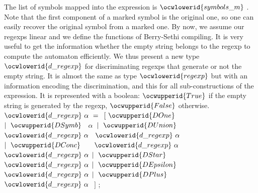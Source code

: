 \documentclass[12pt]{article}
\begin{document}
\ocwendcode{}\ocwindent{0.00em}
The list of symbols mapped into the expression is \ocwbegindcode{}$\ocwlowerid{symbols\_m}$\ocwenddcode{} .
   Note that the first component of a marked symbol is the original one, so
   one can easily recover the original symbol from a marked one. 
\ocweol
\ocwindent{0.00em}
By now, we assume our regexps linear and we define the functions of 
   Berry-Sethi compiling. 
\ocweol
\ocwindent{0.00em}
It is very useful to get the information whether the empty string belongs
   to the regexp to compute the automaton efficiently.
   We thus present a new type \ocwbegindcode{}$\ocwlowerid{d\_regexp}$\ocwenddcode{} for discriminating regexps that
   generate or not the empty string. 
   It is almost the same as type \ocwbegindcode{}$\ocwlowerid{regexp}$\ocwenddcode{} but with an information encoding
   the discrimination, and this for all sub-constructions of the expression.
   It is represented with a boolean: 
   \ocwbegindcode{}$\ocwupperid{True}$\ocwenddcode{} if the empty string is generated by the regexp, 
   \ocwbegindcode{}$\ocwupperid{False}$\ocwenddcode{} otherwise. 
\ocweol
\label{../ML/regular.ml:7009}%
\medskip
\ocwbegincode{}\ocwindent{0.00em}
~$\ocwlowerid{d\_regexp}~\alpha{}~=~$\ocweol
\ocwindent{1.00em}
$[~\ocwupperid{DOne}~$\ocweol
\ocwindent{1.00em}
$\mid{}~\ocwupperid{DSymb}~$~$\alpha{}~$\ocweol
\ocwindent{1.00em}
$\mid{}~\ocwupperid{DUnion}~$~~~$\ocwlowerid{d\_regexp}~\alpha{}~$~$\ocwlowerid{d\_regexp}~\alpha{}$\ocweol
\ocwindent{1.00em}
$\mid{}~\ocwupperid{DConc}~$~~~$\ocwlowerid{d\_regexp}~\alpha{}~$~$\ocwlowerid{d\_regexp}~\alpha{}$\ocweol
\ocwindent{1.00em}
$\mid{}~\ocwupperid{DStar}~$~$\ocwlowerid{d\_regexp}~\alpha{}$\ocweol
\ocwindent{1.00em}
$\mid{}~\ocwupperid{DEpsilon}~$~$\ocwlowerid{d\_regexp}~\alpha{}$\ocweol
\ocwindent{1.00em}
$\mid{}~\ocwupperid{DPlus}~$~~~$\ocwlowerid{d\_regexp}~\alpha{}~$\ocweol
\ocwindent{1.00em}
$]$\ocweol
\ocwindent{0.00em}
;\medskip
\end{document}
